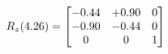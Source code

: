\documentclass[preview]{standalone}
\begin{document}
\begin{align*}
\special{dvisvgm:raw <g id='unique000'>}R_{z}(4.26) = \begin{bmatrix}-0.44 & +0.90 & 0 \\-0.90 & -0.44 & 0 \\0 & 0 & 1\end{bmatrix}\special{dvisvgm:raw </g>}
\end{align*}
\end{document}
